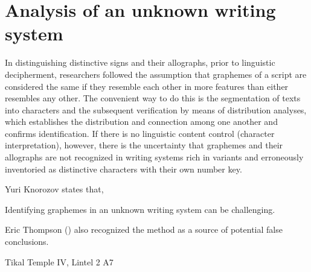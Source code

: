 \documentclass[../main.tex]{subfiles}
\begin{document}
\section{Analysis of an unknown writing system}
In distinguishing distinctive signs and their allographs, prior to linguistic decipherment, 
researchers followed the assumption that graphemes of a script are considered the same if 
they resemble each other in more features than either resembles any other.
The convenient way to do this is the segmentation of texts into characters and the subsequent 
verification by means of distribution analyses, which establishes the distribution and 
connection among one another and confirms identification. 
If there is no linguistic content control (character interpretation), 
however, there is the uncertainty that graphemes and 
their allographs are not recognized in writing systems rich in variants and erroneously 
inventoried as distinctive characters with their own number key.


Yuri Knorozov states that, 



Identifying graphemes in an unknown writing system can be challenging.




Eric Thompson (\cite[12\psq]{thompson1962catalog}) also recognized the method as a source of 
potential false conclusions.


Tikal Temple IV, Lintel 2 A7
\end{document}
